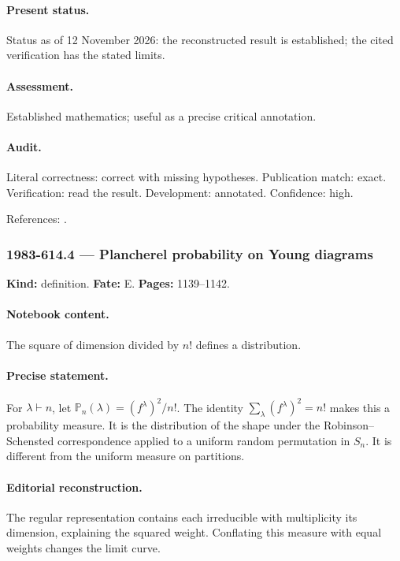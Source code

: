\paragraph{Present status.} Status as of 12 November 2026: the reconstructed result is established; the cited verification has the stated limits.

\paragraph{Assessment.} Established mathematics; useful as a precise critical annotation.

\paragraph{Audit.} Literal correctness: correct with missing hypotheses. Publication match: exact. Verification: read the result. Development: annotated. Confidence: high.

\noindent References: \citep{framerobinsonthrall1954hook,vershikkerov1985dimensions}.\par

\subsubsection{1983-614.4 --- Plancherel probability on Young diagrams}

\label{item:1983-614.4}

\noindent\textbf{Kind:} definition. \textbf{Fate:} E. \textbf{Pages:} 1139--1142.\par

\paragraph{Notebook content.} The square of dimension divided by $n!$ defines a distribution.

\paragraph{Precise statement.} For $\lambda\vdash n$, let $\mathbb P_n(\lambda)=(f^\lambda)^2/n!$. The identity $\sum_\lambda(f^\lambda)^2=n!$ makes this a probability measure. It is the distribution of the shape under the Robinson--Schensted correspondence applied to a uniform random permutation in $S_n$. It is different from the uniform measure on partitions.

\paragraph{Editorial reconstruction.} The regular representation contains each irreducible with multiplicity its dimension, explaining the squared weight. Conflating this measure with equal weights changes the limit curve.

